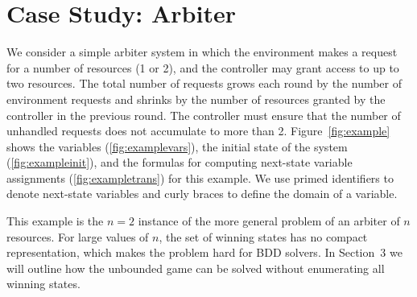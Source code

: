 \section{Case Study: Arbiter}

We consider a simple arbiter system in which the environment makes a request for a number of resources (1 or 2), and the controller may grant access to up to two resources.  The total number of requests grows each round by the number of environment requests and shrinks by the number of resources granted by the controller in the previous round.  The controller must ensure that the number of unhandled requests does not accumulate to more than 2.  Figure~\ref{fig:example} shows the variables (\ref{fig:examplevars}), the initial state of the system (\ref{fig:exampleinit}), and the formulas for computing next-state variable assignments (\ref{fig:exampletrans}) for this example. We use primed identifiers to denote next-state variables and curly braces to define the domain of a variable.

This example is the $n=2$ instance of the more general problem of an arbiter of $n$ resources. For large values of $n$, the set of winning states has no compact representation, which makes the problem hard for BDD solvers. In Section~3 we will outline how the unbounded game can be solved without enumerating all winning states.

